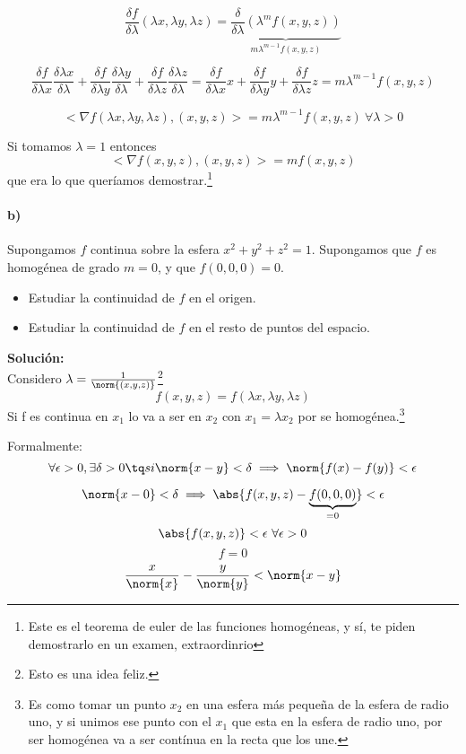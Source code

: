 $$\frac{\delta f}{\delta \lambda}(\lambda x, \lambda y, \lambda z) = \underbrace{\frac{\delta}{\delta \lambda}(\lambda^mf(x,y,z))}_{m\lambda^{m-1}f(x,y,z)}$$

$$\frac{\delta f}{\delta \lambda x}\frac{\delta \lambda x}{\delta \lambda} + \frac{\delta f}{\delta \lambda y}\frac{\delta \lambda y}{\delta \lambda} + \frac{\delta f}{\delta \lambda z}\frac{\delta \lambda z}{\delta \lambda} = \frac{\delta f}{\delta \lambda x}x + \frac{\delta f}{\delta \lambda y}y + \frac{\delta f}{\delta \lambda z}z = m\lambda ^{m-1} f(x,y,z) $$

$$<\nabla f(\lambda x,\lambda y,\lambda z), (x,y,z) > = m\lambda^{m-1} f(x,y,z)\ \forall \lambda > 0$$

Si tomamos $\lambda = 1$ entonces $$<\nabla f(x,y,z), (x,y,z) > = mf(x,y,z)$$ que era lo que queríamos demostrar.\footnote{Este es el teorema de euler de las funciones homogéneas, y sí, te piden demostrarlo en un examen, extraordinrio}

\paragraph{b)} Supongamos $f$ continua sobre la esfera ${x^2+y^2+z^2=1}$. Supongamos que $f$ es homogénea de grado $m = 0$, y que $f(0,0,0) = 0$.

\begin{itemize}
\item Estudiar la continuidad de $f$ en el origen.
\item Estudiar la continuidad de $f$ en el resto de puntos del espacio.
\end{itemize}

\textbf{Solución:}\\
Considero $\lambda = \frac{1}{\norm{(x,y,z)}}$\footnote{Esto es una idea feliz.}\\
$$f(x,y,z) = f(\lambda x, \lambda y, \lambda z)$$
Si f es continua en $x_1$ lo va a ser en $x_2$ con $x_1 = \lambda x_2$ por se homogénea.\footnote{Es como tomar un punto $x_2$ en una esfera más pequeña de la esfera de radio uno, y si unimos ese punto con el $x_1$ que esta en la esfera de radio uno, por ser homogénea va a ser contínua en la recta que los une.}

Formalmente:
$$\forall \epsilon > 0, \exists \delta > 0 \tq si \norm{x-y} < \delta \implies \norm{f(x) - f(y)} < \epsilon$$

$$\norm{x - 0} < \delta \implies \abs{f(x,y,z) - \underbrace{f(0,0,0)}_{=0}} < \epsilon$$
$$\abs{f(x,y,z)} < \epsilon\ \forall \epsilon > 0$$
$$ f = 0$$
$$ \frac{x}{\norm{x}} - \frac{y}{\norm{y}} < \norm{x-y}$$


